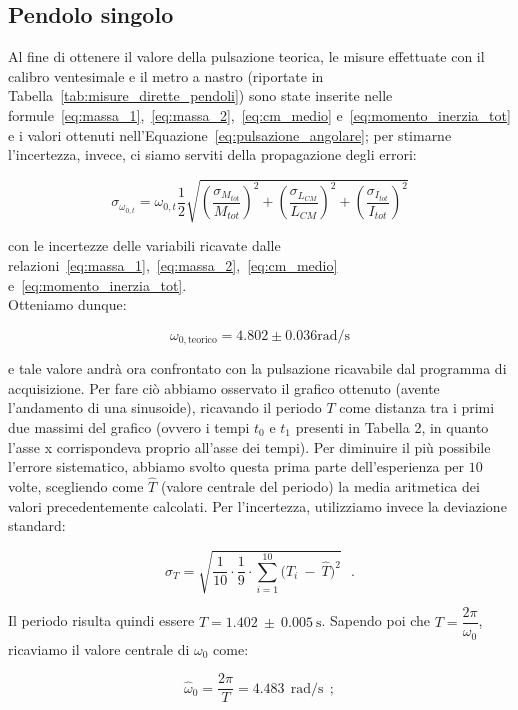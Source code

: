 \documentclass[a4paper,12pt]{article}
\begin{document}
\subsection{Pendolo singolo}

Al fine di ottenere il valore della pulsazione teorica, le misure effettuate con il calibro ventesimale e il metro a nastro (riportate in Tabella~\ref{tab:misure_dirette_pendoli}) sono state inserite nelle formule~\ref{eq:massa_1},~\ref{eq:massa_2},~\ref{eq:cm_medio} e~\ref{eq:momento_inerzia_tot} e i valori ottenuti nell'Equazione~\ref{eq:pulsazione_angolare}; 
per stimarne l'incertezza, invece, ci siamo serviti della propagazione degli errori:

\[
    \sigma_{\omega_{0,t}} = \omega_{0, t} \dfrac{1}{2} \sqrt{ \left( \dfrac{\sigma_{M_{tot}}}{M_{tot}} \right)^2 + \left( \dfrac{\sigma_{L_{CM}}}{L_{CM}} \right)^2 + \left( \dfrac{\sigma_{I_{tot}}}{I_{tot}} \right)^2 }
\]

con le incertezze delle variabili ricavate dalle relazioni~\ref{eq:massa_1},~\ref{eq:massa_2},~\ref{eq:cm_medio} e~\ref{eq:momento_inerzia_tot}.\\
Otteniamo dunque:

\[ \omega_{0, \text{teorico}} = \text{4.802} \pm \text{0.036} \text{rad/s}  \]

e tale valore andrà ora confrontato con la pulsazione ricavabile dal programma di acquisizione. Per fare ciò abbiamo osservato il grafico ottenuto (avente l'andamento di una sinusoide), ricavando il periodo $T$ come distanza tra i primi due massimi del grafico (ovvero i tempi $t_0$ e $t_1$ presenti in Tabella 2, in quanto l'asse x corrispondeva proprio all'asse dei tempi). Per diminuire il più possibile l'errore sistematico, abbiamo svolto questa prima parte dell'esperienza per $10$ volte, scegliendo come $\hat{T}$ (valore centrale del periodo) la media aritmetica dei valori precedentemente calcolati. Per l'incertezza, utilizziamo invece la deviazione standard:

\[
    \sigma_T = \sqrt{\frac{1}{10} \cdot \frac{1}{9} \cdot \sum_{i=1} ^{10} \big(T_i \ - \ \hat{T}\big)^2} \ \ \ .
\]

Il periodo risulta quindi essere $T = 1.402 \ \pm \ 0.005 \ \mathrm{s}$. Sapendo poi che $T = \dfrac{2\pi}{\omega_0}$, ricaviamo il valore centrale di $\omega_0$ come:

\begin{equation}
        \hat{\omega}_0 = \frac{2\pi}{T} = 4.483 \ \ \text{rad/s} \ \ ;
        \label{eq:omega_tempo}
\end{equation}
\end{document}
